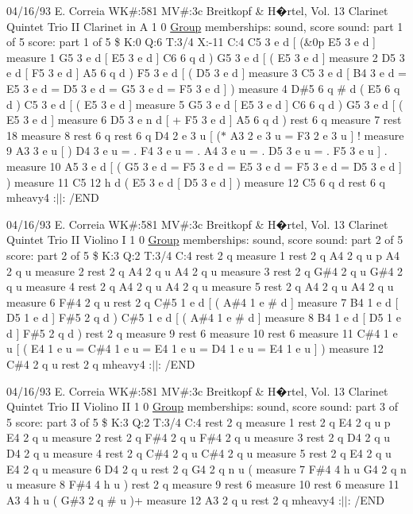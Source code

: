 04/16/93 E. Correia WK\#\+:581 MV\#\+:3c Breitkopf \& H�rtel, Vol. 13 Clarinet Quintet Trio II Clarinet in A 1 0 \hyperlink{class_group}{Group} memberships\+: sound, score sound\+: part 1 of 5 score\+: part 1 of 5 \$ K\+:0 Q\+:6 T\+:3/4 X\+:-\/11 C\+:4 C5 3 e d \mbox{[} (\&0p E5 3 e d \mbox{]} measure 1 G5 3 e d \mbox{[} E5 3 e d \mbox{]} C6 6 q d ) G5 3 e d \mbox{[} ( E5 3 e d \mbox{]} measure 2 D5 3 e d \mbox{[} F5 3 e d \mbox{]} A5 6 q d ) F5 3 e d \mbox{[} ( D5 3 e d \mbox{]} measure 3 C5 3 e d \mbox{[} B4 3 e d = E5 3 e d = D5 3 e d = G5 3 e d = F5 3 e d \mbox{]} ) measure 4 D\#5 6 q \# d ( E5 6 q d ) C5 3 e d \mbox{[} ( E5 3 e d \mbox{]} measure 5 G5 3 e d \mbox{[} E5 3 e d \mbox{]} C6 6 q d ) G5 3 e d \mbox{[} ( E5 3 e d \mbox{]} measure 6 D5 3 e n d \mbox{[} + F5 3 e d \mbox{]} A5 6 q d ) rest 6 q measure 7 rest 18 measure 8 rest 6 q rest 6 q D4 2 e 3 u \mbox{[} ($\ast$ A3 2 e 3 u = F3 2 e 3 u \mbox{]} ! measure 9 A3 3 e u \mbox{[} ) D4 3 e u = . F4 3 e u = . A4 3 e u = . D5 3 e u = . F5 3 e u \mbox{]} . measure 10 A5 3 e d \mbox{[} ( G5 3 e d = F5 3 e d = E5 3 e d = F5 3 e d = D5 3 e d \mbox{]} ) measure 11 C5 12 h d ( E5 3 e d \mbox{[} D5 3 e d \mbox{]} ) measure 12 C5 6 q d rest 6 q mheavy4 \+:$\vert$$\vert$\+: /\+E\+ND

04/16/93 E. Correia WK\#\+:581 MV\#\+:3c Breitkopf \& H�rtel, Vol. 13 Clarinet Quintet Trio II Violino I 1 0 \hyperlink{class_group}{Group} memberships\+: sound, score sound\+: part 2 of 5 score\+: part 2 of 5 \$ K\+:3 Q\+:2 T\+:3/4 C\+:4 rest 2 q measure 1 rest 2 q A4 2 q u p A4 2 q u measure 2 rest 2 q A4 2 q u A4 2 q u measure 3 rest 2 q G\#4 2 q u G\#4 2 q u measure 4 rest 2 q A4 2 q u A4 2 q u measure 5 rest 2 q A4 2 q u A4 2 q u measure 6 F\#4 2 q u rest 2 q C\#5 1 e d \mbox{[} ( A\#4 1 e \# d \mbox{]} measure 7 B4 1 e d \mbox{[} D5 1 e d \mbox{]} F\#5 2 q d ) C\#5 1 e d \mbox{[} ( A\#4 1 e \# d \mbox{]} measure 8 B4 1 e d \mbox{[} D5 1 e d \mbox{]} F\#5 2 q d ) rest 2 q measure 9 rest 6 measure 10 rest 6 measure 11 C\#4 1 e u \mbox{[} ( E4 1 e u = C\#4 1 e u = E4 1 e u = D4 1 e u = E4 1 e u \mbox{]} ) measure 12 C\#4 2 q u rest 2 q mheavy4 \+:$\vert$$\vert$\+: /\+E\+ND

04/16/93 E. Correia WK\#\+:581 MV\#\+:3c Breitkopf \& H�rtel, Vol. 13 Clarinet Quintet Trio II Violino II 1 0 \hyperlink{class_group}{Group} memberships\+: sound, score sound\+: part 3 of 5 score\+: part 3 of 5 \$ K\+:3 Q\+:2 T\+:3/4 C\+:4 rest 2 q measure 1 rest 2 q E4 2 q u p E4 2 q u measure 2 rest 2 q F\#4 2 q u F\#4 2 q u measure 3 rest 2 q D4 2 q u D4 2 q u measure 4 rest 2 q C\#4 2 q u C\#4 2 q u measure 5 rest 2 q E4 2 q u E4 2 q u measure 6 D4 2 q u rest 2 q G4 2 q n u ( measure 7 F\#4 4 h u G4 2 q n u measure 8 F\#4 4 h u ) rest 2 q measure 9 rest 6 measure 10 rest 6 measure 11 A3 4 h u ( G\#3 2 q \# u )+ measure 12 A3 2 q u rest 2 q mheavy4 \+:$\vert$$\vert$\+: /\+E\+ND


